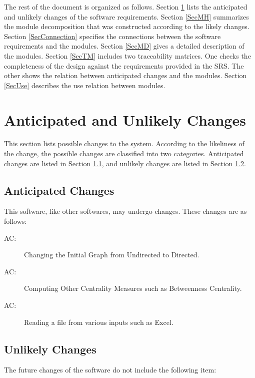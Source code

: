 \documentclass[12pt, titlepage]{article}
\newcounter{acnum}
\newcommand{\actheacnum}{AC\theacnum}
\begin{document}
The rest of the document is organized as follows. Section
\ref{SecChange} lists the anticipated and unlikely changes of the software
requirements. Section \ref{SecMH} summarizes the module decomposition that
was constructed according to the likely changes. Section \ref{SecConnection}
specifies the connections between the software requirements and the
modules. Section \ref{SecMD} gives a detailed description of the
modules. Section \ref{SecTM} includes two traceability matrices. One checks
the completeness of the design against the requirements provided in the SRS. The
other shows the relation between anticipated changes and the modules. Section
\ref{SecUse} describes the use relation between modules.

\section{Anticipated and Unlikely Changes} \label{SecChange}

This section lists possible changes to the system. According to the likeliness
of the change, the possible changes are classified into two
categories. Anticipated changes are listed in Section \ref{SecAchange}, and
unlikely changes are listed in Section \ref{SecUchange}.

\subsection{Anticipated Changes} \label{SecAchange}

This software, like other softwares, may undergo changes. These changes are as follows:

\begin{description}
\item[ \actheacnum \label{acHardware}:] Changing the Initial Graph from Undirected to Directed.
\item[ \actheacnum \label{acInput}:] Computing Other Centrality Measures such as Betweenness Centrality.
\item[ \actheacnum \label{computation}:]  Reading a file from various inputs such as Excel.
\end{description}

\subsection{Unlikely Changes} \label{SecUchange}

The future changes of the software do not include the following item:
\end{document}
